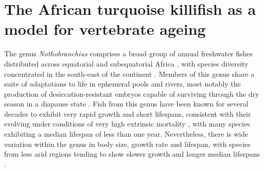 %
%
%
%
%
\section{The African turquoise killifish as a model for vertebrate ageing}
%
%
%
The genus \textit{Nothobranchius} comprises a broad group of annual freshwater fishes distributed across equatorial and subequatorial Africa \parencite{valdesalici2003lifespan}, with species diversity concentrated in the south-east of the continent \parencite{genade2005annual}. Members of this genus share a suite of adaptations to life in ephemeral pools and rivers, most notably the production of desiccation-resistant embryos capable of surviving through the dry season in a diapause state \parencite{genade2005annual}. Fish from this genus have been known for several decades to  exhibit very rapid growth and short lifespans, consistent with their evolving under conditions of very high extrinsic mortality \parencite{valdesalici2003lifespan}, with many species exhibiting a median lifespan of less than one year. Nevertheless, there is wide variation within the genus in body size, growth rate and lifespan, with species from less arid regions tending to show slower growth and longer median lifespans \parencite{genade2005annual}.

